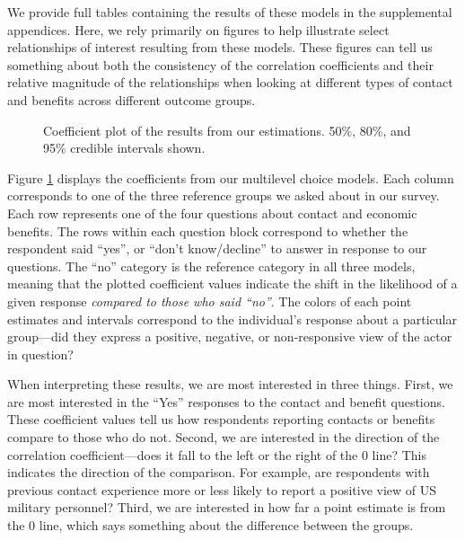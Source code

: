 We provide full tables containing the results of these models in the supplemental appendices. Here, we rely primarily on figures to help illustrate select relationships of interest resulting from these models. These figures can tell us something about both the consistency of the correlation coefficients and their relative magnitude of the relationships when looking at different types of contact and benefits across different outcome groups. 

\begin{figure}[t]
	\centering  {}
	\caption{Coefficient plot of the results from our estimations. 50\%, 80\%, and 95\% credible intervals shown.}
	\label{fig:coefplot1}
\end{figure}%

Figure \ref{fig:coefplot1} displays the coefficients from our multilevel choice models. Each column corresponds to one of the three reference groups we asked about in our survey. Each row represents one of the four questions about contact and economic benefits. The rows within each question block correspond to whether the respondent said ``yes'', or ``don't know/decline'' to answer in response to our questions. The ``no'' category is the reference category in all three models, meaning that the plotted coefficient values indicate the shift in the likelihood of a given response \textit{compared to those who said ``no''}. The colors of each point estimates and intervals correspond to the individual's response about a particular group---did they express a positive, negative, or non-responsive view of the actor in question? 

When interpreting these results, we are most interested in three things. First, we are most interested in the ``Yes'' responses to the contact and benefit questions. These coefficient values tell us how respondents reporting contacts or benefits compare to those who do not. Second, we are interested in the direction of the correlation coefficient---does it fall to the left or the right of the 0 line? This indicates the direction of the comparison. For example, are respondents with previous contact experience more or less likely to report a positive view of US military personnel? Third, we are interested in how far a point estimate is from the 0 line, which says something about the difference between the groups. 

